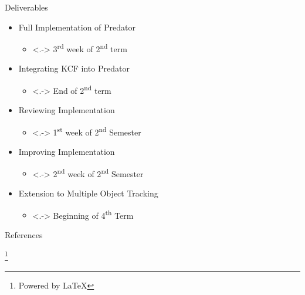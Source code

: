 \documentclass[mathserif]{beamer}
\newcommand\blfootnote[1]{
  \begingroup
  \renewcommand\thefootnote{}\footnote{#1}
  \addtocounter{footnote}{-1}
  \endgroup
}
\begin{document}
\begin{frame}[label=deliverables]{Deliverables}
  \begin{itemize}
    \setlength\itemsep{.5em}
     \item \hspace{0pt}
        \pause Full Implementation of Predator
          \begin{itemize}
            \item<.-> 3\textsuperscript{rd} week of 2\textsuperscript{nd} term
          \end{itemize}
      \pause \item Integrating KCF into Predator
          \begin{itemize}
            \item<.-> End of 2\textsuperscript{nd} term
          \end{itemize}
        \pause \item Reviewing Implementation
          \begin{itemize}
             \item<.-> 1\textsuperscript{st} week of 2\textsuperscript{nd} Semester
          \end{itemize}
            \pause \item Improving Implementation
          \begin{itemize}
            \item<.-> 2\textsuperscript{nd} week of 2\textsuperscript{nd} Semester
          \end{itemize}
            \pause \item Extension to Multiple Object Tracking
          \begin{itemize}
             \item<.-> Beginning of 4\textsuperscript{th} Term
          \end{itemize}
  \end{itemize}

\end{frame}

\begin{frame}{References}
    \printbibliography
    \blfootnote{Powered by \LaTeX}
\end{frame}
\end{document}

